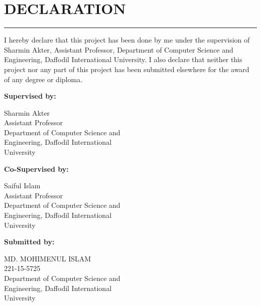 \chapter*{DECLARATION}
\thispagestyle{plain}
\noindent\rule{\linewidth}{0.5pt}

I hereby declare that this project has been done by me under the supervision of Sharmin Akter, Assistant Professor, Department of Computer Science and Engineering, Daffodil International University. I also declare that neither this project nor any part of this project has been submitted elsewhere for the award of any degree or diploma.

\vspace{2cm}
\textbf{Supervised by:}
\vspace{1cm}

Sharmin Akter \\
Assistant Professor \\
Department of Computer Science and \\
Engineering, Daffodil International \\
University

\vspace{2cm}
\textbf{Co-Supervised by:}
\vspace{1cm}

Saiful Islam \\
Assistant Professor \\
Department of Computer Science and \\
Engineering, Daffodil International \\
University

\vspace{2cm}
\textbf{Submitted by:}
\vspace{1cm}

MD. MOHIMENUL ISLAM \\
221-15-5725 \\
Department of Computer Science and \\
Engineering, Daffodil International \\
University

